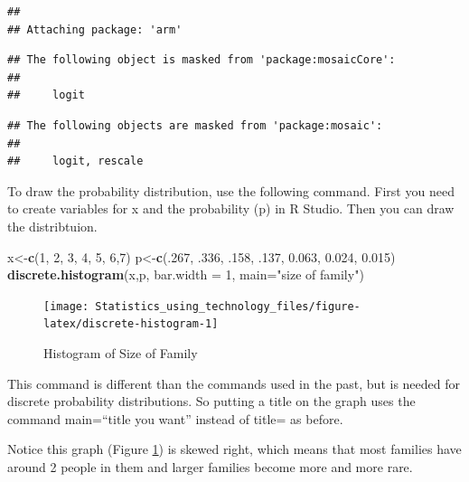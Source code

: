 \documentclass[
]{book}
\newenvironment{Shaded}{\begin{snugshade}}{\end{snugshade}}
\newcommand{\DataTypeTok}[1]{\textcolor[rgb]{0.13,0.29,0.53}{#1}}
\newcommand{\DecValTok}[1]{\textcolor[rgb]{0.00,0.00,0.81}{#1}}
\newcommand{\FloatTok}[1]{\textcolor[rgb]{0.00,0.00,0.81}{#1}}
\newcommand{\KeywordTok}[1]{\textcolor[rgb]{0.13,0.29,0.53}{\textbf{#1}}}
\newcommand{\NormalTok}[1]{#1}
\newcommand{\StringTok}[1]{\textcolor[rgb]{0.31,0.60,0.02}{#1}}
\begin{document}
\begin{verbatim}
## 
## Attaching package: 'arm'
\end{verbatim}

\begin{verbatim}
## The following object is masked from 'package:mosaicCore':
## 
##     logit
\end{verbatim}

\begin{verbatim}
## The following objects are masked from 'package:mosaic':
## 
##     logit, rescale
\end{verbatim}

To draw the probability distribution, use the following command. First you need to create variables for x and the probability (p) in R Studio. Then you can draw the distribtuion.



\begin{Shaded}
\begin{Highlighting}[]
\NormalTok{x<-}\KeywordTok{c}\NormalTok{(}\DecValTok{1}\NormalTok{, }\DecValTok{2}\NormalTok{, }\DecValTok{3}\NormalTok{, }\DecValTok{4}\NormalTok{, }\DecValTok{5}\NormalTok{, }\DecValTok{6}\NormalTok{,}\DecValTok{7}\NormalTok{)}
\NormalTok{p<-}\KeywordTok{c}\NormalTok{(.}\DecValTok{267}\NormalTok{, }\FloatTok{.336}\NormalTok{, }\FloatTok{.158}\NormalTok{, }\FloatTok{.137}\NormalTok{, }\FloatTok{0.063}\NormalTok{, }\FloatTok{0.024}\NormalTok{, }\FloatTok{0.015}\NormalTok{)}
\KeywordTok{discrete.histogram}\NormalTok{(x,p, }\DataTypeTok{bar.width =} \DecValTok{1}\NormalTok{, }\DataTypeTok{main=}\StringTok{"size of family"}\NormalTok{)}
\end{Highlighting}
\end{Shaded}

\begin{figure}
\texttt{[image: Statistics\_using\_technology\_files/figure-latex/discrete-histogram-1]} \caption{Histogram of Size of Family}\label{fig:discrete-histogram}
\end{figure}

This command is different than the commands used in the past, but is needed for discrete probability distributions. So putting a title on the graph uses the command main=``title you want'' instead of title= as before.

Notice this graph (Figure \ref{fig:discrete-histogram}) is skewed right, which means that most families have around 2 people in them and larger families become more and more rare.
\end{document}
